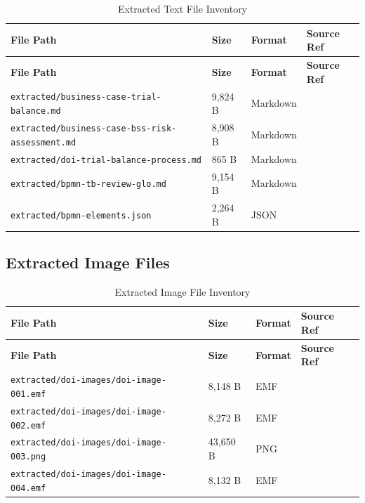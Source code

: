 \begin{longtable}{@{}L{6cm}C{2cm}C{2cm}L{3.5cm}@{}}
\caption{Extracted Text File Inventory}
\label{tab:extracted-text-inventory} \\
\toprule
\textbf{File Path} & \textbf{Size} & \textbf{Format} & \textbf{Source Ref} \\
\midrule
\endfirsthead
\toprule
\textbf{File Path} & \textbf{Size} & \textbf{Format} & \textbf{Source Ref} \\
\midrule
\endhead
\texttt{extracted/business-case-trial-balance.md} & 9,824 B & Markdown &  \\
\texttt{extracted/business-case-bss-risk-assessment.md} & 8,908 B & Markdown &  \\
\texttt{extracted/doi-trial-balance-process.md} & 865 B & Markdown &  \\
\texttt{extracted/bpmn-tb-review-glo.md} & 9,154 B & Markdown &  \\
\texttt{extracted/bpmn-elements.json} & 2,264 B & JSON &  \\
\bottomrule
\end{longtable}

\subsection{Extracted Image Files}

\begin{longtable}{@{}L{6cm}C{2cm}C{2cm}L{3.5cm}@{}}
\caption{Extracted Image File Inventory}
\label{tab:extracted-image-inventory} \\
\toprule
\textbf{File Path} & \textbf{Size} & \textbf{Format} & \textbf{Source Ref} \\
\midrule
\endfirsthead
\toprule
\textbf{File Path} & \textbf{Size} & \textbf{Format} & \textbf{Source Ref} \\
\midrule
\endhead
\texttt{extracted/doi-images/doi-image-001.emf} & 8,148 B & EMF &  \\
\texttt{extracted/doi-images/doi-image-002.emf} & 8,272 B & EMF &  \\
\texttt{extracted/doi-images/doi-image-003.png} & 43,650 B & PNG &  \\
\texttt{extracted/doi-images/doi-image-004.emf} & 8,132 B & EMF &  \\
\bottomrule
\end{longtable}

